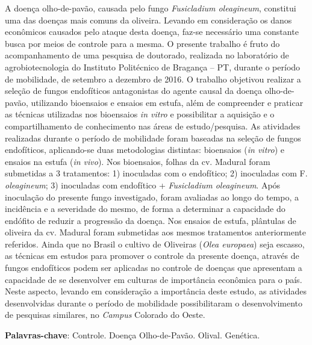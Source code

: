 \documentclass[article,12pt,onesidea,4paper,english,brazil]{abntex2}
\begin{document}
	\noindent A doença olho-de-pavão, causada pelo fungo \textit{Fusicladium oleagineum}, constitui uma das doenças mais comuns da oliveira. Levando em consideração os danos econômicos causados pelo ataque desta doença, faz-se necessário uma constante busca por meios de controle para a mesma. O presente trabalho é fruto do	acompanhamento de uma pesquisa de doutorado, realizada no laboratório de agrobiotecnologia do Instituto Politécnico de Bragança – PT, durante o período de mobilidade, de setembro a dezembro de 2016. O trabalho objetivou realizar a
	seleção de fungos endofíticos antagonistas do agente causal da doença olho-de-
	pavão, utilizando bioensaios e ensaios em estufa, além de compreender e praticar
	as técnicas utilizadas nos bioensaios \textit{in vitro} e possibilitar a aquisição e o
	compartilhamento de conhecimento nas áreas de estudo/pesquisa. As atividades
	realizadas durante o período de mobilidade foram baseadas na seleção de fungos
	endofíticos, aplicando-se duas metodologias distintas: bioensaios (\textit{in vitro}) e ensaios	na estufa (\textit{in vivo}). Nos bioensaios, folhas da cv. Madural foram submetidas a 3 tratamentos: 1) inoculadas com o endofítico; 2) inoculadas com F. \textit{oleagineum}; 3)
	inoculadas com endofítico + \textit{Fusicladium oleagineum}. Após inoculação do presente
	fungo investigado, foram avaliadas ao longo do tempo, a incidência e a severidade
	do mesmo, de forma a determinar a capacidade do endófito de reduzir a progressão
	da doença. Nos ensaios de estufa, plântulas de oliveira da cv. Madural foram
	submetidas aos mesmos tratamentos anteriormente referidos. Ainda que no Brasil o
	cultivo de Oliveiras (\textit{Olea europaea}) seja escasso, as técnicas em estudos para
	promover o controle da presente doença, através de fungos endofíticos podem ser
	aplicadas no controle de doenças que apresentam a capacidade de se desenvolver
	em culturas de importância econômica para o país. Neste aspecto, levando em
	consideração a importância deste estudo, as atividades desenvolvidas durante o
	período de mobilidade possibilitaram o desenvolvimento de pesquisas similares, no
	\textit{Campus} Colorado do Oeste.
	
	\vspace{\onelineskip}
	
	\noindent
	\textbf{Palavras-chave}: Controle. Doença Olho-de-Pavão. Olival. Genética.
	
\end{document}
